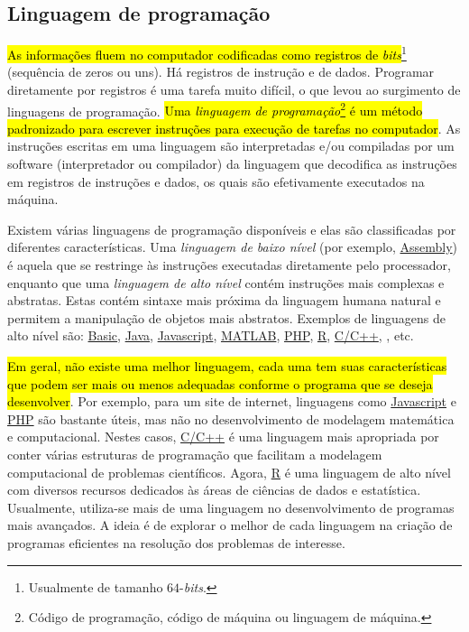 \subsection{Linguagem de programação}

\hl{As informações fluem no computador codificadas como registros de {\it bits}}\footnote{Usualmente de tamanho $64$-{\it bits}.} (sequência de zeros ou uns). Há registros de instrução e de dados. Programar diretamente por registros é uma tarefa muito difícil, o que levou ao surgimento de linguagens de programação. \hl{Uma \emph{linguagem de programação}\footnote{Código de programação, código de máquina ou linguagem de máquina.} é um método padronizado para escrever instruções para execução de tarefas no computador}. As instruções escritas em uma linguagem são interpretadas e/ou compiladas por um software (interpretador ou compilador) da linguagem que decodifica as instruções em registros de instruções e dados, os quais são efetivamente executados na máquina.

Existem várias linguagens de programação disponíveis e elas são classificadas por diferentes características. Uma \emph{linguagem de baixo nível} (por exemplo, \href{https://pt.wikipedia.org/wiki/Linguagem_assembly}{Assembly}) é aquela que se restringe às instruções executadas diretamente pelo processador, enquanto que uma \emph{linguagem de alto nível} contém instruções mais complexas e abstratas. Estas contém sintaxe mais próxima da linguagem humana natural e permitem a manipulação de objetos mais abstratos. Exemplos de linguagens de alto nível são: \href{https://pt.wikipedia.org/wiki/BASIC}{Basic}, \href{https://pt.wikipedia.org/wiki/Java\_(linguagem\_de\_programa\%C3\%A7\%C3\%A3o)}{Java}, \href{https://pt.wikipedia.org/wiki/JavaScript}{Javascript}, \href{https://pt.wikipedia.org/wiki/MATLAB}{MATLAB}, \href{https://pt.wikipedia.org/wiki/PHP}{PHP}, \href{https://pt.wikipedia.org/wiki/R\_(linguagem_de_programa\%C3\%A7\%C3\%A3o)}{R}, \href{https://pt.wikipedia.org/wiki/C\%2B\%2B}{C/C++}, {\python}, etc.

\hl{Em geral, não existe uma melhor linguagem, cada uma tem suas características que podem ser mais ou menos adequadas conforme o programa que se deseja desenvolver}. Por exemplo, para um site de internet, linguagens como \href{https://pt.wikipedia.org/wiki/JavaScript}{Javascript} e \href{https://pt.wikipedia.org/wiki/PHP}{PHP} são bastante úteis, mas não no desenvolvimento de modelagem matemática e computacional. Nestes casos, \href{https://pt.wikipedia.org/wiki/C\%2B\%2B}{C/C++} é uma linguagem mais apropriada por conter várias estruturas de programação que facilitam a modelagem computacional de problemas científicos. Agora, \href{https://pt.wikipedia.org/wiki/R\_(linguagem_de_programa\%C3\%A7\%C3\%A3o)}{R} é uma linguagem de alto nível com diversos recursos dedicados às áreas de ciências de dados e estatística. Usualmente, utiliza-se mais de uma linguagem no desenvolvimento de programas mais avançados. A ideia é de explorar o melhor de cada linguagem na criação de programas eficientes na resolução dos problemas de interesse.

